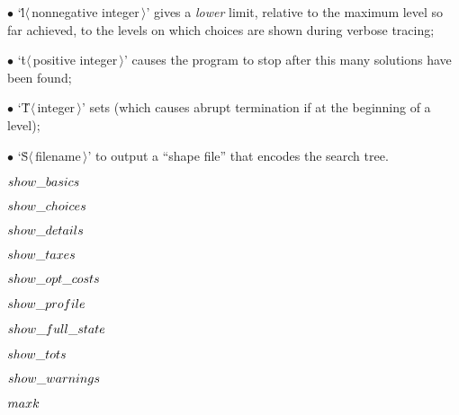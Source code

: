 \item{$\bullet$}
`\.l$\langle\,$nonnegative integer$\,\rangle$' gives a {\it lower\/} limit,
relative to the maximum level so far achieved, to the levels on which
choices are shown during verbose tracing;
\item{$\bullet$}
`\.t$\langle\,$positive integer$\,\rangle$' causes the program to
stop after this many solutions have been found;
\item{$\bullet$}
`\.T$\langle\,$integer$\,\rangle$' sets  (which causes abrupt
termination if  at the beginning of a level);
\item{$\bullet$}
`\.S$\langle\,$filename$\,\rangle$' to output a ``shape file'' that encodes
the search tree.

\Y\B\4\D$\\{show\_basics}$ \5
\par
\B\4\D$\\{show\_choices}$ \5
\par
\B\4\D$\\{show\_details}$ \5
\par
\B\4\D$\\{show\_taxes}$ \5
\par
\B\4\D$\\{show\_opt\_costs}$ \5
\par
\B\4\D$\\{show\_profile}$ \5
\par
\B\4\D$\\{show\_full\_state}$ \5
\par
\B\4\D$\\{show\_tots}$ \5
\par
\B\4\D$\\{show\_warnings}$ \5
\par
\B\4\D$\\{maxk}$ \5
\par
\fi

